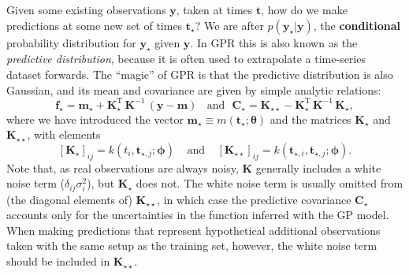 \documentclass[letterpaper]{ar-1col}
\newcommand{\hyperparams}{\ensuremath{\boldsymbol{\phi}}}
\newcommand{\meanparams}{\ensuremath{\boldsymbol{\theta}}}
\begin{document}
Given some existing observations $\mathbf{y}$, taken at times $\mathbf{t}$, how do we make predictions at some new set of times $\mathbf{t}_\star$? We are after $p(\mathbf{y}_\star|\mathbf{y})$, the \textbf{conditional} probability distribution for $\mathbf{y}_\star$ given $\mathbf{y}$. In GPR this is also known as the \emph{predictive distribution}, because it is often used to extrapolate a time-series dataset forwards. The ``magic'' of GPR is that the predictive distribution is also Gaussian, and its mean and covariance are given by simple analytic relations:
\begin{equation}
  \label{eq:pred}
  \mathbf{f}_\star = \mathbf{m}_\star + \mathbf{K}_\star^{\mathrm{T}} \, \mathbf{K}^{-1} \, (\mathbf{y} - \mathbf{m}) ~\mathrm{~~~and~~~}
  \mathbf{C}_\star =   \mathbf{K}_{\star\star} - \mathbf{K}_\star^{\mathrm{T}} \, \mathbf{K}^{-1} \, \mathbf{K}_\star,
\end{equation}
where we have introduced the vector $\mathbf{m}_\star \equiv m(\mathbf{t}_\star;\meanparams)$ and the matrices $\mathbf{K}_\star$ and $\mathbf{K}_{\star\star}$, with elements
\begin{equation}
  \label{eq:Kstar}
    [\mathbf{K}_\star]_{ij} = k(t_i,\mathbf{t}_{\star,j}; \hyperparams) ~~~~~ \text{and} ~~~~~
    [\mathbf{K}_{\star\star}]_{ij} = k(\mathbf{t}_{\star,i},\mathbf{t}_{\star,j};\hyperparams).
\end{equation}
Note that, as real observations are always noisy, $\mathbf{K}$ generally includes a white noise term ($\delta_{ij} \sigma^2_i$), but $\mathbf{K}_\star$ does not. The white noise term is usually omitted from (the diagonal elements of) $\mathbf{K}_{\star\star}$, in which case the predictive covariance $\mathbf{C}_\star$ accounts only for the uncertainties in the function inferred with the GP model. When making predictions that represent hypothetical additional observations taken with the same setup as the training set, however, the white noise term should be included in $\mathbf{K}_{\star\star}$. %
\end{document}
